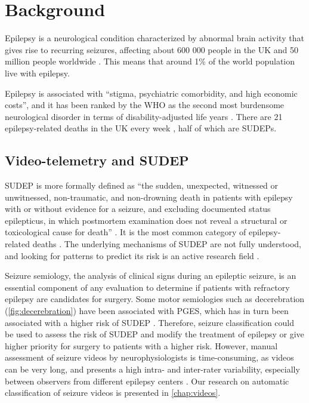 \section{Background}

Epilepsy is a neurological condition characterized by abnormal brain activity that gives rise to recurring seizures, affecting about 600 000 people in the UK and 50 million people worldwide \cite{nice_epilepsies_2012,fiest_prevalence_2017}.
This means that around 1\% of the world population live with epilepsy.

Epilepsy is associated with ``stigma, psychiatric comorbidity, and high economic costs'', and it has been ranked by the \ac{WHO} as the second most burdensome neurological disorder in terms of disability-adjusted life years \cite{fiest_prevalence_2017}.
There are 21 epilepsy-related deaths in the UK every week%
,
half of which are \acp{SUDEP}.  %


\subsection{Video-telemetry and SUDEP}

\ac{SUDEP} is more formally defined as ``the sudden, unexpected, witnessed or unwitnessed, non-traumatic, and non-drowning death in patients with epilepsy with or without evidence for a seizure, and excluding documented status epilepticus, in which postmortem examination does not reveal a structural or toxicological cause for death'' \cite{nashef_sudden_1997}.
It is the most common category of epilepsy-related deaths \cite{devinsky_sudden_2016}.
The underlying mechanisms of \ac{SUDEP} are not fully understood, and looking for patterns to predict its risk is an active research field \cite{so_what_2008,jha_sudden_2021}.

Seizure semiology, the analysis of clinical signs during an epileptic seizure, is an essential component of any evaluation to determine if patients with refractory epilepsy are candidates for surgery.
Some motor semiologies such as decerebration (\cref{fig:decerebration}) have been associated with \ac{PGES}, which has in turn been associated with a higher risk of \ac{SUDEP} \cite{alexandre_risk_2015,vilella_association_2021}.
Therefore, seizure classification could be used to assess the risk of \ac{SUDEP} and modify the treatment of epilepsy or give higher priority for surgery to patients with a higher risk.
However, manual assessment of seizure videos by neurophysiologists is time-consuming, as videos can be very long, and presents a high intra- and inter-rater variability, especially between observers from different epilepsy centers \cite{tufenkjian_seizure_2012}.
Our research on automatic classification of seizure videos is presented in \cref{chap:videos}.

